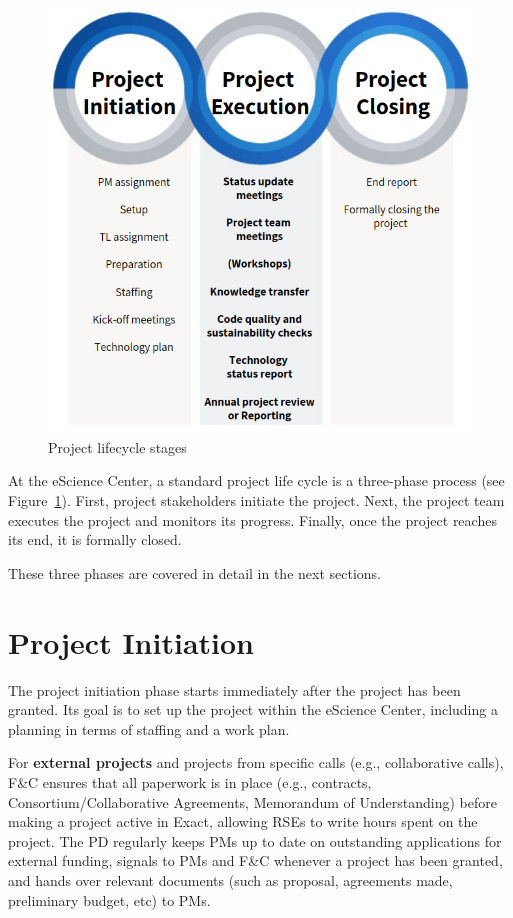 \documentclass[11pt]{article}
\begin{document}
\begin{figure}[!h]
    \centering
    \includegraphics[scale=0.5]{img/lifecycle-stages.png}
    \caption{Project lifecycle stages}
    \label{fig:project-lifecycle}
\end{figure}

At the eScience Center, a standard project life cycle is a three-phase process (see Figure~\ref{fig:project-lifecycle}). First, project stakeholders initiate the
project. Next, the project team executes the project and monitors its progress. Finally, once the project reaches its
end, it is formally closed.

These three phases are covered in detail in the next sections.

\clearpage
\section{Project Initiation}
\label{sec:init}
The project initiation phase starts immediately after the project has been granted. Its goal is to set up the project
within the eScience Center, including a planning in terms of staffing and a work plan.

For \textbf{external projects} and projects from specific calls (e.g., collaborative calls), F\&C ensures that all
paperwork is in place (e.g., contracts, Consortium/Collaborative Agreements, Memorandum of Understanding) before making
a project active in Exact, allowing RSEs to write hours spent on the project. The PD regularly keeps PMs up to date on
outstanding applications for external funding, signals to PMs and F\&C whenever a project has been granted, and hands
over relevant documents (such as proposal, agreements made, preliminary budget, etc) to PMs. 
\end{document}
